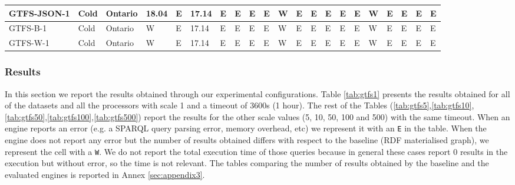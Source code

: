 \begin{table}[]
{\begin{tabular}{|l|l|l|l|l|l|l|l|l|l|l|l|l|l|l|l|l|l|l|l|l|}
GTFS-JSON-1                                             & Cold                   & Ontario        & 18.04       & E           & 17.14       & E           & E           & E           & E           & W           & E           & E            & E            & E            & E            & W            & E            & E            & E            & E            \\ \hline
GTFS-B-1                                                & Cold                   & Ontario        & W           & E           & 17.14       & E           & E           & E           & E           & W           & E           & E            & E            & E            & E            & W            & E            & E            & E            & E            \\ \hline
GTFS-W-1                                                & Cold                   & Ontario        & W           & E           & 17.14       & E           & E           & E           & E           & W           & E           & E            & E            & E            & E            & W            & E            & E            & E            & E            \\  \hline
\end{tabular}%
}
\end{table}

\subsubsection{Results}
In this section we report the results obtained through our experimental configurations. Table \ref{tab:gtfs1} presents the results obtained for all of the datasets and all the processors with scale 1 and a timeout of 3600s (1 hour). The rest of the Tables (\ref{tab:gtfs5},\ref{tab:gtfs10},\ref{tab:gtfs50},\ref{tab:gtfs100},\ref{tab:gtfs500}) report the results for the other scale values (5, 10, 50, 100 and 500) with the same timeout. When an engine reports an error (e.g. a SPARQL query parsing error, memory overhead, etc) we represent it with an \texttt{E} in the table. When the engine does not report any error but the number of results obtained differs with respect to the baseline (RDF materialised graph), we represent the cell with a \texttt{W}. We do not report the total execution time of those queries because in general these cases report 0 results in the execution but without error, so the time is not relevant. The tables comparing the number of results obtained by the baseline and the evaluated engines is reported in Annex \ref{sec:appendix3}.  

